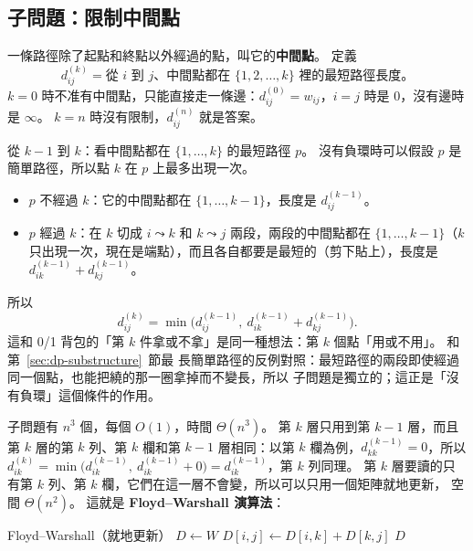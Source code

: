 \subsection{子問題：限制中間點}

一條路徑除了起點和終點以外經過的點，叫它的\textbf{中間點}。 定義
\[
d_{ij}^{(k)} = \text{從 } i \text{ 到 } j \text{、中間點都在 } \{1, 2, \ldots, k\} \text{ 裡的最短路徑長度。}
\]
$k = 0$ 時不准有中間點，只能直接走一條邊：$d_{ij}^{(0)} = w_{ij}$，$i = j$ 時是 $0$，沒有邊時
是 $\infty$。 $k = n$ 時沒有限制，$d_{ij}^{(n)}$ 就是答案。

從 $k - 1$ 到 $k$：看中間點都在 $\{1, \ldots, k\}$ 的最短路徑 $p$。 沒有負環時可以假設 $p$
是簡單路徑，所以點 $k$ 在 $p$ 上最多出現一次。
\begin{itemize}
\item $p$ 不經過 $k$：它的中間點都在 $\{1, \ldots, k-1\}$，長度是 $d_{ij}^{(k-1)}$。
\item $p$ 經過 $k$：在 $k$ 切成 $i \leadsto k$ 和 $k \leadsto j$ 兩段，兩段的中間點都在
$\{1, \ldots, k - 1\}$（$k$ 只出現一次，現在是端點），而且各自都要是最短的（剪下貼上），長度是
$d_{ik}^{(k-1)} + d_{kj}^{(k-1)}$。
\end{itemize}
所以
\[
d_{ij}^{(k)} = \min\bigl( d_{ij}^{(k-1)},\ d_{ik}^{(k-1)} + d_{kj}^{(k-1)} \bigr) .
\]
這和 0/1 背包的「第 $k$ 件拿或不拿」是同一種想法：第 $k$ 個點「用或不用」。 和第~\ref{sec:dp-substructure}~節最
長簡單路徑的反例對照：最短路徑的兩段即使經過同一個點，也能把繞的那一圈拿掉而不變長，所以
子問題是獨立的；這正是「沒有負環」這個條件的作用。

子問題有 $n^3$ 個，每個 $O(1)$，時間 $\Theta(n^3)$。 第 $k$ 層只用到第 $k - 1$ 層，而且第 $k$
層的第 $k$ 列、第 $k$ 欄和第 $k - 1$ 層相同：以第 $k$ 欄為例，$d_{kk}^{(k-1)} = 0$，所以
$d_{ik}^{(k)} = \min\bigl(d_{ik}^{(k-1)},\ d_{ik}^{(k-1)} + 0\bigr) = d_{ik}^{(k-1)}$，第 $k$ 列同理。
第 $k$ 層要讀的只有第 $k$ 列、第 $k$ 欄，它們在這一層不會變，所以可以只用一個矩陣就地更新，
空間 $\Theta(n^2)$。 這就是 \textbf{Floyd--Warshall 演算法}：

\begin{pseudo}[label=alg:dp-fw]{Floyd--Warshall（就地更新）}
    \State $D \gets W$ 
                    \State $D[i, j] \gets D[i, k] + D[k, j]$
                \EndIf
            \EndFor
        \EndFor
    \EndFor
    \State \Return $D$
\EndFunction
\end{pseudo}

